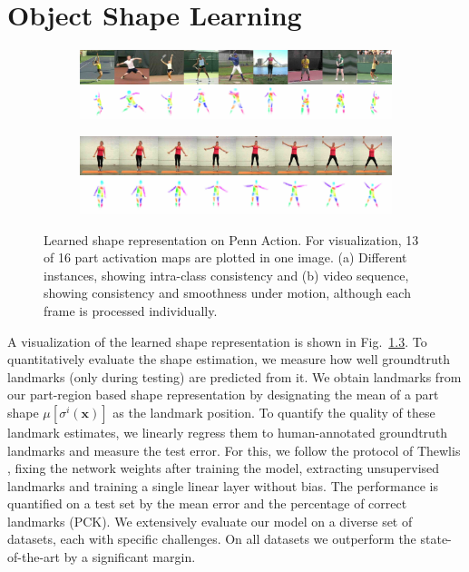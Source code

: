 
\chapter{Object Shape Learning}
	\begin{figure}[htp]
		\begin{subfigure}{1.\textwidth}
		\centering
		\includegraphics[trim={0cm 0cm 0cm 0cm},clip, width=1.\linewidth]{fig/shape/shape8white}\caption{}
		\label{fig:shape_penn}
		\end{subfigure}
		\begin{subfigure}{1.\textwidth}
		\centering
		\includegraphics[trim={0cm 0cm 0cm 0cm},clip, width=1.\linewidth]{fig//shape/shape_yoga8}\caption{}
		\label{fig:shape_tennis}
		\end{subfigure}
		\caption{Learned shape representation on Penn Action. For visualization, 13 of 16 part activation maps are plotted in one image. (a) Different instances, showing intra-class consistency and (b) video sequence, showing consistency and smoothness under motion, although each frame is processed individually.}
		\label{fig:shape}
	\end{figure}

	A visualization of the learned shape representation is shown in Fig.~\ref{fig:shape}. 
	To quantitatively evaluate the shape estimation, we measure how well groundtruth landmarks (only during testing) are predicted from it.
	We obtain landmarks from our part-region based shape representation by designating the mean of a part shape $\mu[\sigma^i(\mathbf{x})]$ as the landmark position. To quantify the quality of these landmark estimates, we linearly regress them to human-annotated groundtruth landmarks and measure the test error.
	For this, we follow the protocol of Thewlis \etal \cite{thewlis17}, fixing the network weights after training the model, extracting unsupervised landmarks and training a single linear layer without bias.
	The performance is quantified on a test set by the mean error and the percentage of correct landmarks (PCK).
	We extensively evaluate our model on a diverse set of datasets, each with specific challenges.
	On all datasets we outperform the state-of-the-art by a significant margin.\\

